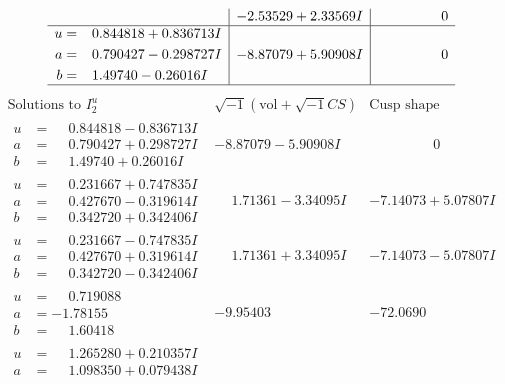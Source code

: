 \documentclass[1p]{elsarticle_modified}
\theoremstyle{definition}
\newcommand{\I}{\sqrt{-1}}
\begin{document}
$$\begin{array}{c|c|c}
 & -2.53529 + 2.33569 I & \phantom{-0.000000 } 0 \\ \hline\begin{aligned}
u &= \phantom{-}0.844818 + 0.836713 I \\
a &= \phantom{-}0.790427 - 0.298727 I \\
b &= \phantom{-}1.49740 - 0.26016 I\end{aligned}
 & -8.87079 + 5.90908 I & \phantom{-0.000000 } 0\\
 \hline 
 \end{array}$$\newpage$$\begin{array}{c|c|c}  
\text{Solutions to }I^u_{2}& \I (\text{vol} + \sqrt{-1}CS) & \text{Cusp shape}\\
 \hline 
\begin{aligned}
u &= \phantom{-}0.844818 - 0.836713 I \\
a &= \phantom{-}0.790427 + 0.298727 I \\
b &= \phantom{-}1.49740 + 0.26016 I\end{aligned}
 & -8.87079 - 5.90908 I & \phantom{-0.000000 } 0 \\ \hline\begin{aligned}
u &= \phantom{-}0.231667 + 0.747835 I \\
a &= \phantom{-}0.427670 - 0.319614 I \\
b &= \phantom{-}0.342720 + 0.342406 I\end{aligned}
 & \phantom{-}1.71361 - 3.34095 I & -7.14073 + 5.07807 I \\ \hline\begin{aligned}
u &= \phantom{-}0.231667 - 0.747835 I \\
a &= \phantom{-}0.427670 + 0.319614 I \\
b &= \phantom{-}0.342720 - 0.342406 I\end{aligned}
 & \phantom{-}1.71361 + 3.34095 I & -7.14073 - 5.07807 I \\ \hline\begin{aligned}
u &= \phantom{-}0.719088\phantom{ +0.000000I} \\
a &= -1.78155\phantom{ +0.000000I} \\
b &= \phantom{-}1.60418\phantom{ +0.000000I}\end{aligned}
 & -9.95403\phantom{ +0.000000I} & -72.0690\phantom{ +0.000000I} \\ \hline\begin{aligned}
u &= \phantom{-}1.265280 + 0.210357 I \\
a &= \phantom{-}1.098350 + 0.079438 I \\

\end{aligned}
\end{array}$$
\end{document}

